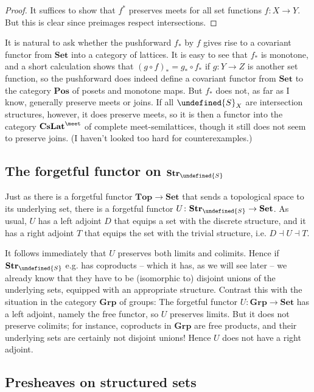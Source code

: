 \documentclass[article, a4paper, 11pt, oneside]{memoir}
\let\mathfrak\undefined
\numberwithin{equation}{chapter}
\newcommand{\strucS}{\mathfrak{S}}
\newcommand{\ncat}[1]{\mathbf{#1}} %
\newcommand{\catSet}{\ncat{Set}} %
\newcommand{\catGrp}{\ncat{Grp}} %
\newcommand{\catTop}{\ncat{Top}} %
\newcommand{\catPos}{\ncat{Pos}} %
\newcommand{\catCMeetLat}{\ncat{CsLat}^{\meet}} %
\newcommand{\catStruc}[1]{\ncat{Str}_{#1}} %
\newcommand{\catStrucS}{\catStruc{\strucS}} %
\begin{document}
\begin{proof}
    It suffices to show that $f^*$ preserves meets for all set functions $f \colon X \to Y$. But this is clear since preimages respect intersections.
\end{proof}

It is natural to ask whether the pushforward $f_*$ by $f$ gives rise to a covariant functor from $\catSet$ into a category of lattices. It is easy to see that $f_*$ is monotone, and a short calculation shows that $(g \circ f)_* = g_* \circ f_*$ if $g \colon Y \to Z$ is another set function, so the pushforward does indeed define a covariant functor from $\catSet$ to the category $\catPos$ of posets and monotone maps. But $f_*$ does not, as far as I know, generally preserve meets or joins. If all $\strucS_X$ are intersection structures, however, it does preserve meets, so it is then a functor into the category $\catCMeetLat$ of complete meet-semilattices, though it still does not seem to preserve joins. (I haven't looked too hard for counterexamples.)


\subsection{The forgetful functor on $\catStrucS$}

Just as there is a forgetful functor $\catTop \to \catSet$ that sends a topological space to its underlying set, there is a forgetful functor $U \colon \catStrucS \to \catSet$. As usual, $U$ has a left adjoint $D$ that equips a set with the discrete structure, and it has a right adjoint $T$ that equips the set with the trivial structure, i.e. $D \dashv U \dashv T$.

It follows immediately that $U$ preserves both limits and colimits. Hence if $\catStrucS$ e.g. has coproducts -- which it has, as we will see later -- we already know that they have to be (isomorphic to) disjoint unions of the underlying sets, equipped with an appropriate structure. Contrast this with the situation in the category $\catGrp$ of groups: The forgetful functor $U \colon \catGrp \to \catSet$ has a left adjoint, namely the free functor, so $U$ preserves limits. But it does not preserve colimits; for instance, coproducts in $\catGrp$ are free products, and their underlying sets are certainly not disjoint unions! Hence $U$ does not have a right adjoint.


\subsection{Presheaves on structured sets}
\end{document}
